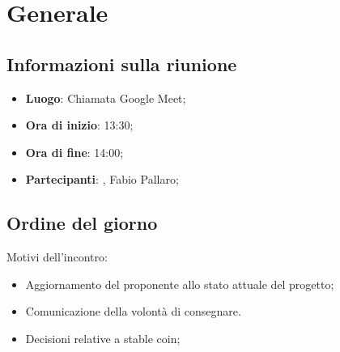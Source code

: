 \section{Generale}

\vspace{10pt}


\subsection{Informazioni sulla riunione}
\begin{itemize}
	\item \textbf{Luogo}: Chiamata Google Meet;
	\item \textbf{Ora di inizio}: 13:30;
	\item \textbf{Ora di fine}: 14:00;
	\item \textbf{Partecipanti}: \team, Fabio Pallaro;
\end{itemize}

\vspace{5pt}

\subsection{Ordine del giorno}
Motivi dell'incontro:
\begin{itemize}
	\item Aggiornamento del proponente allo stato attuale del progetto;
	\item Comunicazione della volontà di consegnare.
	\item Decisioni relative a stable coin\glo;
\end{itemize}
